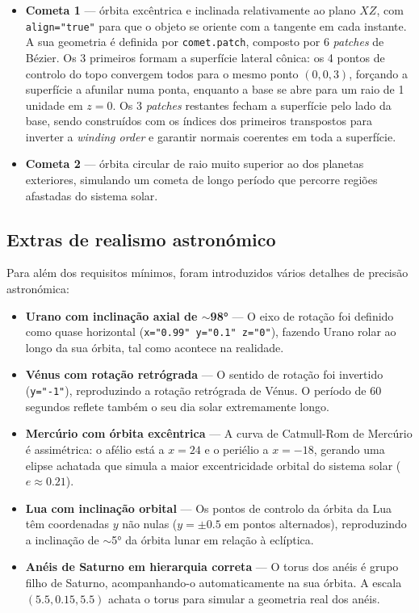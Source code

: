 \documentclass[12pt,a4paper]{article}
\begin{document}
\begin{itemize}
    \item \textbf{Cometa 1} — órbita excêntrica e inclinada relativamente ao plano $XZ$, com \texttt{align="true"} para que o objeto se oriente com a tangente em cada instante. A sua geometria é definida por \texttt{comet.patch}, composto por 6 \textit{patches} de Bézier. Os 3 primeiros formam a superfície lateral cônica: os 4 pontos de controlo do topo convergem todos para o mesmo ponto $(0, 0, 3)$, forçando a superfície a afunilar numa ponta, enquanto a base se abre para um raio de 1 unidade em $z=0$. Os 3 \textit{patches} restantes fecham a superfície pelo lado da base, sendo construídos com os índices dos primeiros transpostos para inverter a \textit{winding order} e garantir normais coerentes em toda a superfície.
    \item \textbf{Cometa 2} — órbita circular de raio muito superior ao dos planetas exteriores, simulando um cometa de longo período que percorre regiões afastadas do sistema solar.
\end{itemize}

\subsection{Extras de realismo astronómico}

Para além dos requisitos mínimos, foram introduzidos vários detalhes de precisão astronómica:

\begin{itemize}
    \item \textbf{Urano com inclinação axial de $\sim$98°} — O eixo de rotação foi definido como quase horizontal (\texttt{x="0.99" y="0.1" z="0"}), fazendo Urano rolar ao longo da sua órbita, tal como acontece na realidade.

    \item \textbf{Vénus com rotação retrógrada} — O sentido de rotação foi invertido (\texttt{y="-1"}), reproduzindo a rotação retrógrada de Vénus. O período de 60 segundos reflete também o seu dia solar extremamente longo.

    \item \textbf{Mercúrio com órbita excêntrica} — A curva de Catmull-Rom de Mercúrio é assimétrica: o afélio está a $x=24$ e o periélio a $x=-18$, gerando uma elipse achatada que simula a maior excentricidade orbital do sistema solar ($e \approx 0.21$).

    \item \textbf{Lua com inclinação orbital} — Os pontos de controlo da órbita da Lua têm coordenadas $y$ não nulas ($y=\pm 0.5$ em pontos alternados), reproduzindo a inclinação de $\sim$5° da órbita lunar em relação à eclíptica.

    \item \textbf{Anéis de Saturno em hierarquia correta} — O torus dos anéis é grupo filho de Saturno, acompanhando-o automaticamente na sua órbita. A escala $(5.5, 0.15, 5.5)$ achata o torus para simular a geometria real dos anéis.
\end{itemize}
\end{document}
